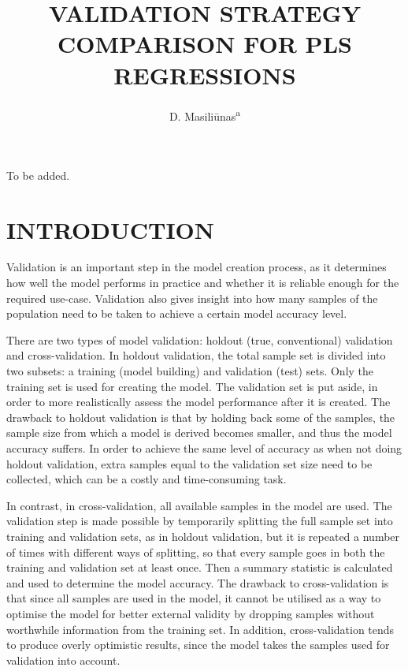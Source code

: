 \documentclass{isprs}
\begin{document}
\title{VALIDATION STRATEGY COMPARISON FOR PLS REGRESSIONS}

\author{
 D. Masili\=unas\textsuperscript{a}}

\address
{
	\textsuperscript{a }Wageningen University, Droevendaalsesteeg 3, NL 6708 PB, Wageningen, The Netherlands - dainius.masiliunas@wur.nl
}

\icwg{}   %

\abstract
{
To be added.
}


\maketitle

\section{INTRODUCTION}\label{INTRODUCTION}

Validation is an important step in the model creation process, as it determines how well the model performs in practice and whether it is reliable enough for the required use-case. Validation also gives insight into how many samples of the population need to be taken to achieve a certain model accuracy level.

There are two types of model validation: holdout (true, conventional) validation and cross-validation. In holdout validation, the total sample set is divided into two subsets: a training (model building) and validation (test) sets. Only the training set is used for creating the model. The validation set is put aside, in order to more realistically assess the model performance after it is created. The drawback to holdout validation is that by holding back some of the samples, the sample size from which a model is derived becomes smaller, and thus the model accuracy suffers. In order to achieve the same level of accuracy as when not doing holdout validation, extra samples equal to the validation set size need to be collected, which can be a costly and time-consuming task.

In contrast, in cross-validation, all available samples in the model are used. The validation step is made possible by temporarily splitting the full sample set into training and validation sets, as in holdout validation, but it is repeated a number of times with different ways of splitting, so that every sample goes in both the training and validation set at least once. Then a summary statistic is calculated and used to determine the model accuracy. The drawback to cross-validation is that since all samples are used in the model, it cannot be utilised as a way to optimise the model for better external validity by dropping samples without worthwhile information from the training set. In addition, cross-validation tends to produce overly optimistic results, since the model takes the samples used for validation into account.
\end{document}
